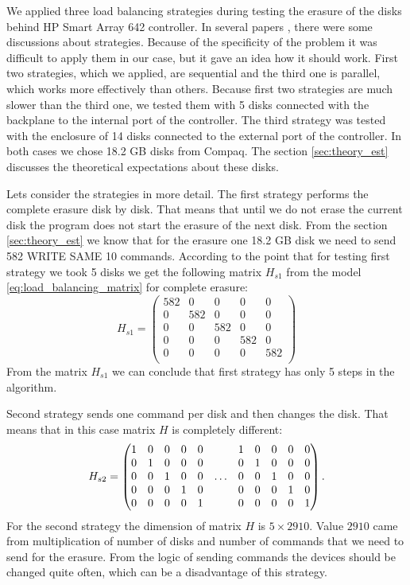 We applied three load balancing strategies during testing the erasure of the disks behind HP Smart Array 642 controller. In several papers \cite{load_bal_policy}, \cite{diff_policies} there were some discussions about strategies. Because of the specificity of the problem it was difficult to apply them in our case, but it gave an idea how it should work. First two strategies, which we applied, are sequential and the third one is parallel, which works more effectively than others. Because first two strategies are much slower than the third one, we tested them with 5 disks connected with the backplane to the internal port of the controller. The third strategy was tested with the enclosure of 14 disks connected to the external port of the controller. In both cases we chose 18.2 GB disks from Compaq. The section \ref{sec:theory_est} discusses the theoretical expectations about these disks.

Lets consider the strategies in more detail. The first strategy performs the complete erasure disk by disk. That means that until we do not erase the current disk the program does not start the erasure of the next disk. From the section \ref{sec:theory_est} we know that for the erasure one 18.2 GB disk we need to send 582 WRITE SAME 10 commands. According to the point that for testing first strategy we took 5 disks we get the following matrix $H_{s1}$ from the model \ref{eq:load_balancing_matrix} for complete erasure:
\begin{equation}
	H_{s1} =
	\begin{pmatrix}
		582 & 0 & 0 & 0 & 0\\
		0 & 582 & 0 & 0 & 0\\
		0 & 0 & 582 & 0 & 0\\
		0 & 0 & 0 & 582 & 0 \\
		0 & 0 & 0 & 0 & 582 \\
	\end{pmatrix}
\end{equation}
From the matrix $H_{s1}$ we can conclude that first strategy has only 5 steps in the algorithm.


Second strategy sends one command per disk and then changes the disk. That means that in this case
matrix $H$ is completely different:
\begin{equation}
\setcounter{MaxMatrixCols}{13}
	H_{s2} =
	\begin{pmatrix}
		1 & 0 & 0 & 0 & 0 &&  		1 & 0 & 0 & 0 & 0 \\
		0 & 1 & 0 & 0 & 0 &&  		0 & 1 & 0 & 0 & 0 \\
		0 & 0 & 1 & 0 & 0 &\ldots&   0 & 0 & 1 & 0 & 0 \\
		0 & 0 & 0 & 1 & 0 &&  		0 & 0 & 0 & 1 & 0 \\
		0 & 0 & 0 & 0 & 1 &&  		0 & 0 & 0 & 0 & 1 \\
	\end{pmatrix}.
\end{equation}
For the second strategy the dimension of matrix $H$ is $5\times2910$. Value $2910$ came from multiplication of number of disks and number of commands that we need to send for the erasure. From the logic of sending commands the devices should be changed quite often, which can be a disadvantage of this strategy. 


